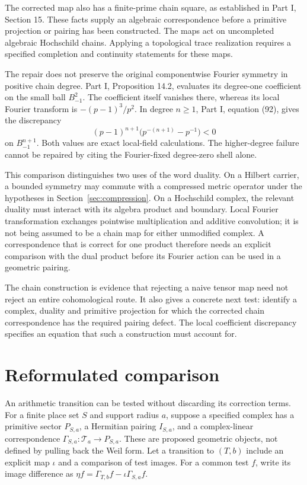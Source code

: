 \documentclass[11pt,letterpaper]{article}
\theoremstyle{definition}
\theoremstyle{remark}
\newcommand{\T}{\mathcal T}
\begin{document}
The corrected map also has a finite-prime chain square,
as established in Part I, Section 15. These facts supply
an algebraic correspondence before a primitive projection
or pairing has been constructed. The maps act on
uncompleted algebraic Hochschild chains. Applying a
topological trace realization requires a specified
completion and continuity statements for these maps.

The repair does not preserve the original componentwise
Fourier symmetry in positive chain degree. Part I,
Proposition 14.2, evaluates its degree-one coefficient
on the small ball $B_{-1}^2$. The coefficient itself
vanishes there, whereas its local Fourier transform is
$-(p-1)^3/p^2$. In degree $n\geq1$, Part I, equation (92),
gives the discrepancy
\[
 (p-1)^{n+1}\bigl(p^{-(n+1)}-p^{-1}\bigr)<0
\]
on $B_{-1}^{n+1}$. Both values are exact local-field
calculations. The higher-degree failure cannot be repaired
by citing the Fourier-fixed degree-zero shell alone.

This comparison distinguishes two uses of the word
duality. On a Hilbert carrier, a bounded symmetry may
commute with a compressed metric operator under the
hypotheses in Section~\ref{sec:compression}. On a
Hochschild complex, the relevant duality must interact
with its algebra product and boundary. Local Fourier
transformation exchanges pointwise multiplication and
additive convolution; it is not being assumed to be a
chain map for either unmodified complex. A correspondence
that is correct for one product therefore needs an
explicit comparison with the dual product before its
Fourier action can be used in a geometric pairing.

The chain construction is evidence that rejecting a
naive tensor map need not reject an entire cohomological
route. It also gives a concrete next test: identify a
complex, duality and primitive projection for which the
corrected chain correspondence has the required pairing
defect. The local coefficient discrepancy specifies an
equation that such a construction must account for.

\section{Reformulated comparison}
\label{sec:reformulation}

An arithmetic transition can be tested without discarding
its correction terms. For a finite place set $S$ and support
radius $a$, suppose a specified complex has a primitive
sector $P_{S,a}$, a Hermitian pairing $I_{S,a}$, and a
complex-linear correspondence
$\Gamma_{S,a}:\T_a\to P_{S,a}$.
These are proposed geometric objects, not defined by
pulling back the Weil form. Let a transition to $(T,b)$
include an explicit map $\iota$ and a comparison of test
images. For a common test $f$, write its image difference
as $\eta f=\Gamma_{T,b}f-\iota\Gamma_{S,a}f$.
\end{document}

